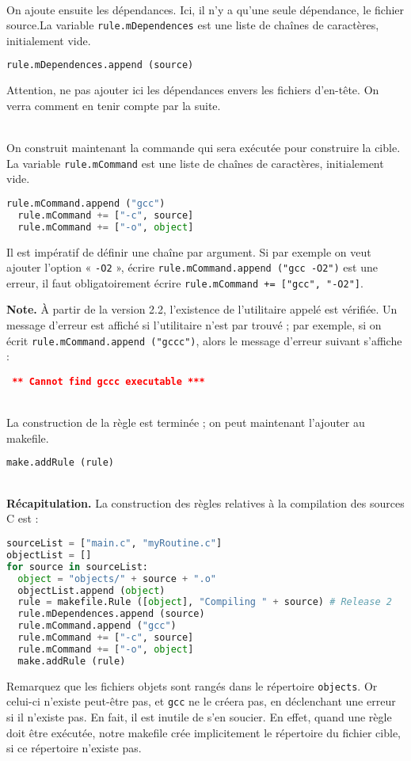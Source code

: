 \documentclass[a4paper,11pt]{extarticle}
\begin{document}
~\\On ajoute ensuite les dépendances. Ici, il n'y a qu'une seule dépendance, le fichier source.La variable \texttt{rule.mDependences} est une liste de chaînes de caractères, initialement vide.
\begin{lstlisting}[language=py]
  rule.mDependences.append (source)
\end{lstlisting}
Attention, ne pas ajouter ici les dépendances envers les fichiers d'en-tête. On verra comment en tenir compte par la suite.

~\\On construit maintenant la commande qui sera exécutée pour construire la cible. La variable \texttt{rule.mCommand} est une liste de chaînes de caractères, initialement vide.
\begin{lstlisting}[language=py]
  rule.mCommand.append ("gcc")
  rule.mCommand += ["-c", source]
  rule.mCommand += ["-o", object]
\end{lstlisting}
Il est impératif de définir une chaîne par argument. Si par exemple on veut ajouter l'option « \texttt{-O2} », écrire \texttt{rule.mCommand.append ("gcc -O2")} est une erreur, il faut obligatoirement écrire \texttt{rule.mCommand += ["gcc", "-O2"]}.

{\bf Note.}\label{verifUtilitaire} À partir de la version 2.2, l'existence de l'utilitaire appelé est vérifiée. Un message d'erreur est affiché si l'utilitaire n'est par trouvé ; par exemple, si on écrit \texttt{rule.mCommand.append ("gccc")}, alors le message d'erreur suivant s'affiche :
\begin{mdframed}[hidealllines=true,backgroundcolor=lightgray!20]
\tt\footnotesize
\textcolor{red}{\bf*** Cannot find~\textquotesingle gccc\textquotesingle~executable ***}
\end{mdframed}

~\\La construction de la règle est terminée ; on peut maintenant l'ajouter au makefile.
\begin{lstlisting}[language=py]
  make.addRule (rule)
\end{lstlisting}


~\\{\bf Récapitulation.} La construction des règles relatives à la compilation des sources C est :
\begin{lstlisting}[language=py]
sourceList = ["main.c", "myRoutine.c"]
objectList = []
for source in sourceList:
  object = "objects/" + source + ".o"
  objectList.append (object)
  rule = makefile.Rule ([object], "Compiling " + source) # Release 2
  rule.mDependences.append (source)
  rule.mCommand.append ("gcc")
  rule.mCommand += ["-c", source]
  rule.mCommand += ["-o", object]
  make.addRule (rule)
\end{lstlisting}
Remarquez que les fichiers objets sont rangés dans le répertoire \texttt{objects}. Or celui-ci n'existe peut-être pas, et \texttt{gcc} ne le créera pas, en déclenchant une erreur si il n'existe pas. En fait, il est inutile de s'en soucier. En effet, quand une règle doit être exécutée, notre makefile crée implicitement le répertoire du fichier cible, si ce répertoire n'existe pas.
\end{document}
